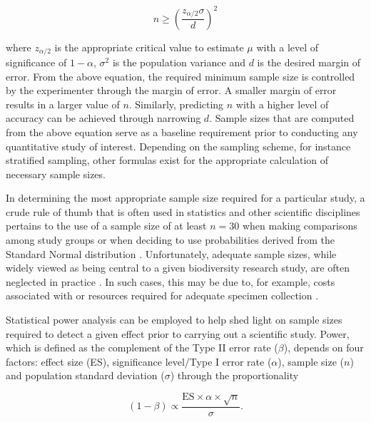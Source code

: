 \begin{equation}
n \geq \left(\frac{z_{\alpha/2}\sigma}{d}\right)^2
\end{equation}



\noindent where $z_{\alpha/2}$ is the appropriate critical value to estimate $\mu$ with a level of significance of $1 - \alpha$, $\sigma^2$ is the population variance and $d$ is the desired margin of error. From the above equation, the required minimum sample size is controlled by the experimenter through the margin of error. A smaller margin of error results in a larger value of $n$. Similarly, predicting $n$ with a higher level of accuracy can be achieved through narrowing $d$. Sample sizes that are computed from the above equation serve as a baseline requirement prior to conducting any quantitative study of interest. Depending on the sampling scheme, for instance stratified sampling, other formulas exist for the appropriate calculation of necessary sample sizes.



In determining the most appropriate sample size required for a particular study, a crude rule of thumb that is often used in statistics and other scientific disciplines pertains to the use of a sample size of at least $n = 30$ when making comparisons among study groups or when deciding to use probabilities derived from the Standard Normal distribution \cite{cohen1990things}. Unfortunately, adequate sample sizes, while widely viewed as being central to a given biodiversity research study, are often neglected in practice \cite{lenth2001some}. In such cases, this may be due to, for example, costs associated with or resources required for adequate specimen collection \cite{cameron2006will, hortal2005ed, muirhead2008identifying}.



Statistical power analysis can be employed to help shed light on sample sizes required to detect a given effect prior to carrying out a scientific study. Power, which is defined as the complement of the Type II error rate ($\beta$), depends on four factors: effect size (ES), significance level/Type I error rate ($\alpha$), sample size ($n$) and population standard deviation ($\sigma$) through the proportionality \cite{di2003much}

\begin{equation}
(1 - \beta) \propto \frac{\textrm{ES} \times \alpha \times \sqrt{n}}{\sigma}.
\end{equation}

